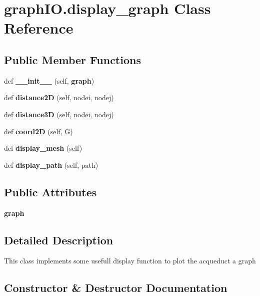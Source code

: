 \section{graph\+I\+O.\+display\+\_\+graph Class Reference}
\label{classgraph_i_o_1_1display__graph}
\subsection*{Public Member Functions}
\begin{DoxyCompactItemize}
\item 
def \textbf{ \+\_\+\+\_\+init\+\_\+\+\_\+} (self, \textbf{ graph})
\item 
def \textbf{ distance2D} (self, nodei, nodej)
\item 
def \textbf{ distance3D} (self, nodei, nodej)
\item 
def \textbf{ coord2D} (self, G)
\item 
def \textbf{ display\+\_\+mesh} (self)
\item 
def \textbf{ display\+\_\+path} (self, path)
\end{DoxyCompactItemize}
\subsection*{Public Attributes}
\begin{DoxyCompactItemize}
\item 
\textbf{ graph}
\end{DoxyCompactItemize}


\subsection{Detailed Description}
\begin{DoxyVerb}This class implements some usefull display function to plot the acqueduct a graph
\end{DoxyVerb}
 

\subsection{Constructor \& Destructor Documentation}
\mbox{\label{classgraph_i_o_1_1display__graph_a85738f48a8c587635575f205c85eb723}} 
